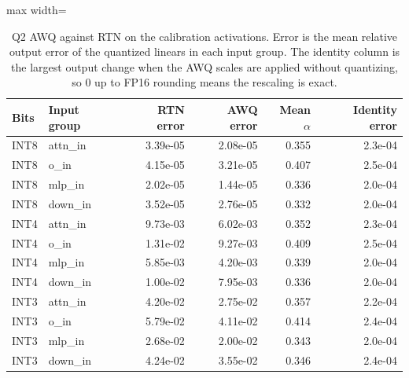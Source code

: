 \begin{table}[!htb]
\centering
\scriptsize
\setlength{\tabcolsep}{3.5pt}
\caption{Q2 AWQ against RTN on the calibration activations. Error is the mean relative output error of the quantized linears in each input group. The identity column is the largest output change when the AWQ scales are applied without quantizing, so 0 up to FP16 rounding means the rescaling is exact.}
\label{tab:t1awq}
\begin{adjustbox}{max width=\linewidth}
\begin{tabular}{llrrrr}
\toprule
Bits & Input group & RTN error & AWQ error & Mean $\alpha$ & Identity error \\
\midrule
INT8 & attn\_in & 3.39e-05 & 2.08e-05 & 0.355 & 2.3e-04 \\
INT8 & o\_in & 4.15e-05 & 3.21e-05 & 0.407 & 2.5e-04 \\
INT8 & mlp\_in & 2.02e-05 & 1.44e-05 & 0.336 & 2.0e-04 \\
INT8 & down\_in & 3.52e-05 & 2.76e-05 & 0.332 & 2.0e-04 \\
INT4 & attn\_in & 9.73e-03 & 6.02e-03 & 0.352 & 2.3e-04 \\
INT4 & o\_in & 1.31e-02 & 9.27e-03 & 0.409 & 2.5e-04 \\
INT4 & mlp\_in & 5.85e-03 & 4.20e-03 & 0.339 & 2.0e-04 \\
INT4 & down\_in & 1.00e-02 & 7.95e-03 & 0.336 & 2.0e-04 \\
INT3 & attn\_in & 4.20e-02 & 2.75e-02 & 0.357 & 2.2e-04 \\
INT3 & o\_in & 5.79e-02 & 4.11e-02 & 0.414 & 2.4e-04 \\
INT3 & mlp\_in & 2.68e-02 & 2.00e-02 & 0.343 & 2.0e-04 \\
INT3 & down\_in & 4.24e-02 & 3.55e-02 & 0.346 & 2.4e-04 \\
\bottomrule
\end{tabular}
\end{adjustbox}
\end{table}
